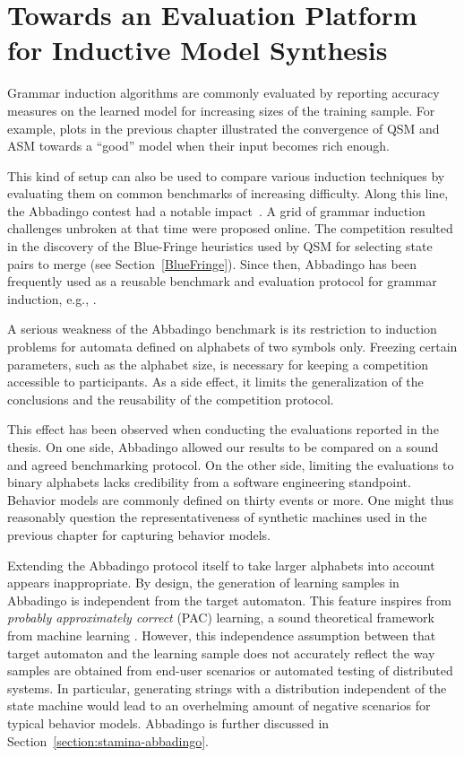\chapter{Towards an Evaluation Platform for Inductive Model Synthesis\label{chapter:stamina}}

Grammar induction algorithms are commonly evaluated by reporting accuracy measures on the learned model for increasing sizes of the training sample. For example, plots in the previous chapter illustrated the convergence of QSM and ASM towards a ``good'' model when their input becomes rich enough. 

This kind of setup can also be used to compare various induction techniques by evaluating them on common benchmarks of increasing difficulty. Along this line, the Abbadingo contest had a notable impact~\cite{Lang:1998}. A grid of grammar induction challenges unbroken at that time were proposed online. The competition resulted in the discovery of the Blue-Fringe heuristics used by QSM for selecting state pairs to merge (see Section~\ref{BlueFringe}). Since then, Abbadingo has been frequently used as a reusable benchmark and evaluation protocol for grammar induction, e.g., \cite{Lucas:2003, Bongard:2005, Lucas:2005, Adriaans:2006, Dupont:2008, Lambeau:2008, Heule:2010}.

A serious weakness of the Abbadingo benchmark is its restriction to induction problems for automata defined on alphabets of two symbols only. Freezing certain parameters, such as the alphabet size, is necessary for keeping a competition accessible to participants. As a side effect, it limits the generalization of the conclusions and the reusability of the competition protocol. 

This effect has been observed when conducting the evaluations reported in the thesis. On one side, Abbadingo allowed our results to be compared on a sound and agreed benchmarking protocol. On the other side, limiting the evaluations to binary alphabets lacks credibility from a software engineering standpoint. Behavior models are commonly defined on thirty events or more. One might thus reasonably question the representativeness of synthetic machines used in the previous chapter for capturing behavior models.

Extending the Abbadingo protocol itself to take larger alphabets into account appears inappropriate. By design, the generation of learning samples in Abbadingo is independent from the target automaton. This feature inspires from \emph{probably approximately correct} (PAC) learning, a sound theoretical framework from machine learning \cite{Valiant:1984}. However, this independence assumption between that target automaton and the learning sample does not accurately reflect the way samples are obtained from end-user scenarios or automated testing of distributed systems. In particular, generating strings with a distribution independent of the state machine would lead to an overhelming amount of negative scenarios for typical behavior models. Abbadingo is further discussed in Section~\ref{section:stamina-abbadingo}.

